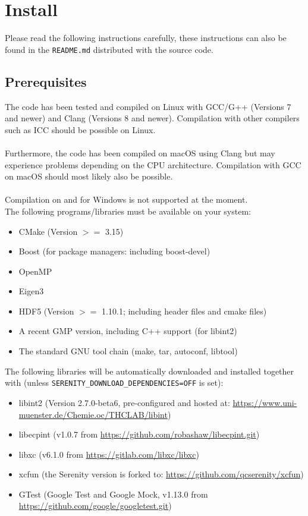 \chapter{Install}
Please read the following instructions carefully, these instructions can also be found in the \texttt{README.md} distributed with
the source code.

\section{Prerequisites}
The code has been tested and compiled on Linux with GCC/G++
(Versions 7 and newer) and Clang (Versions 8 and newer).
Compilation with other compilers such as ICC should be
possible on Linux.\\
\\
Furthermore, the code has been compiled on macOS using Clang
but may experience problems depending on the CPU architecture.
Compilation with GCC on macOS should most likely also be possible.\\
\\
Compilation on and for Windows is not supported at the moment.
\\
The following programs/libraries must be available on your system:
\begin{itemize}
 \item CMake (Version $>=$ 3.15)
 \item Boost (for package managers: including boost-devel)
 \item OpenMP
 \item Eigen3
 \item HDF5 (Version $>=$ 1.10.1; including header files and cmake files)
 \item A recent GMP version, including C++ support (for libint2)
 \item The standard GNU tool chain (make, tar, autoconf, libtool)
\end{itemize}
The following libraries will be automatically downloaded and installed together
with \serenity (unless \texttt{SERENITY\_DOWNLOAD\_DEPENDENCIES=OFF} is set):
\begin{itemize}
 \item libint2 (Version 2.7.0-beta6, pre-configured and hosted at: \url{https://www.uni-muenster.de/Chemie.oc/THCLAB/libint})
 \item libecpint (v1.0.7 from \url{https://github.com/robashaw/libecpint.git})
 \item libxc (v6.1.0 from \url{https://gitlab.com/libxc/libxc})
 \item xcfun (the Serenity version is forked to: \url{https://github.com/qcserenity/xcfun})
 \item GTest (Google Test and Google Mock, v1.13.0 from \url{https://github.com/google/googletest.git})
\end{itemize}
